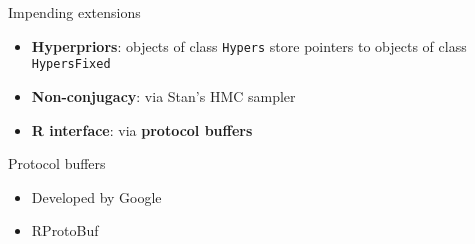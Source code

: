 \begin{frame}{Impending extensions}
	\begin{itemize}
	   \item \textbf{Hyperpriors}: objects of class \texttt{Hypers} store pointers to objects of class \texttt{HypersFixed}
	   \item \textbf{Non-conjugacy}: via Stan's HMC sampler
	   \item  \textbf{R interface}: via \textbf{protocol buffers}
	\end{itemize}
\end{frame}

\begin{frame}{Protocol buffers}
	\begin{itemize}
		\item Developed by Google
		\item RProtoBuf
	\end{itemize}
\end{frame}

